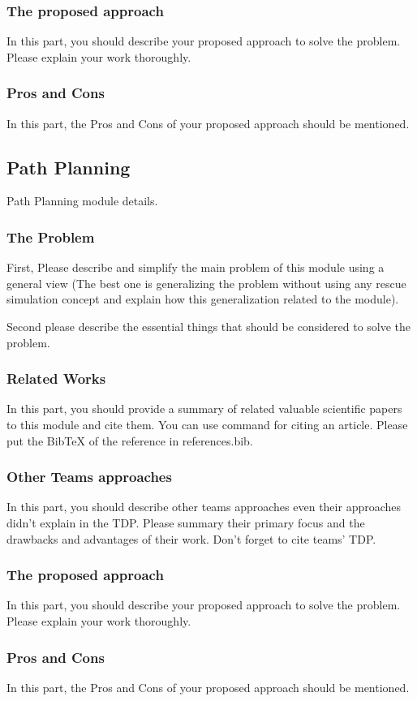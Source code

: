 \documentclass[runningheads,a4paper]{llncs}
\begin{document}
\subsubsection{The proposed approach}
In this part, you should describe your proposed approach to solve the problem. Please explain your work thoroughly.
\subsubsection{Pros and Cons}
In this part, the Pros and Cons of your proposed approach should be mentioned.
\subsection{Path Planning}
Path Planning module details.
\subsubsection{The Problem}
First, Please describe and simplify the main problem of this module using a general view (The best one is generalizing the problem without using any rescue simulation concept and explain how this generalization related to the module).

Second please describe the essential things that should be considered to solve the problem.
\subsubsection{Related Works}
In this part, you should provide a summary of related valuable scientific papers to this module and cite them. You can use command \cite{ref1} for citing an article. Please put the BibTeX of the reference in references.bib.
\subsubsection{Other Teams approaches}
In this part, you should describe other teams approaches even their approaches didn't explain in the TDP. Please summary their primary focus and the drawbacks and advantages of their work. Don't forget to cite teams' TDP.
\subsubsection{The proposed approach}
In this part, you should describe your proposed approach to solve the problem. Please explain your work thoroughly.
\subsubsection{Pros and Cons}
In this part, the Pros and Cons of your proposed approach should be mentioned.
\end{document}
